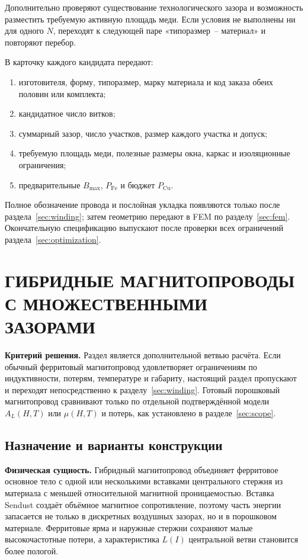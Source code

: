 \documentclass[14pt,a4paper]{extarticle}
\newcommand{\phys}{\par\noindent\textbf{Физическая сущность.} }
\newcommand{\criterion}{\par\noindent\textbf{Критерий решения.} }
\begin{document}
Дополнительно проверяют существование технологического зазора и возможность
разместить требуемую активную площадь меди. Если условия не выполнены ни для
одного $N$, переходят к следующей паре «типоразмер~-- материал» и повторяют
перебор.

В карточку каждого кандидата передают:
\begin{enumerate}
 \item изготовителя, форму, типоразмер, марку материала и код заказа
 обеих половин или комплекта;
 \item кандидатное число витков;
 \item суммарный зазор, число участков, размер каждого участка и допуск;
 \item требуемую площадь меди, полезные размеры окна, каркас и
изоляционные ограничения;
 \item предварительные $B_{\max}$, $P_{\text{Fe}}$ и бюджет
$P_{\text{Cu}}$.
\end{enumerate}

Полное обозначение провода и послойная укладка появляются только после
раздела~\ref{sec:winding}; затем геометрию передают в FEM по
разделу~\ref{sec:fem}. Окончательную спецификацию выпускают после проверки
всех ограничений раздела~\ref{sec:optimization}.

\section{ГИБРИДНЫЕ МАГНИТОПРОВОДЫ С МНОЖЕСТВЕННЫМИ ЗАЗОРАМИ}
\label{sec:hybrid-core}

\criterion Раздел является дополнительной ветвью расчёта. Если обычный
ферритовый магнитопровод удовлетворяет ограничениям по индуктивности,
потерям, температуре и габариту, настоящий раздел пропускают и переходят
непосредственно к разделу~\ref{sec:winding}. Готовый порошковый
магнитопровод сравнивают только по отдельной подтверждённой модели
$A_L(H,T)$ или $\mu(H,T)$ и потерь, как установлено в
разделе~\ref{sec:scope}.

\subsection{Назначение и варианты конструкции}

\phys Гибридный магнитопровод объединяет ферритовое основное тело с одной
или несколькими вставками центрального стержня из материала с меньшей
относительной магнитной проницаемостью. Вставка Sendust создаёт объёмное
магнитное сопротивление, поэтому часть энергии запасается не только в
дискретных воздушных зазорах, но и в порошковом материале. Ферритовые ярма и
наружные стержни сохраняют малые высокочастотные потери, а характеристика
$L(I)$ центральной ветви становится более пологой.
\end{document}
